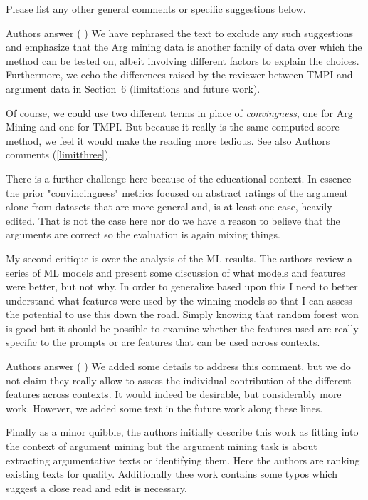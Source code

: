 \documentclass[notitlepage,12pt]{article}
\makeatletter
\newcounter{answ}
\newcommand{\customlabel}[2]{%
\protected@write \@auxout {}{\string \newlabel {#1}{{#2}{}}}}
\makeatother
\begin{document}
\begin{revcomment}{Please list any other general comments or specific suggestions below.}
\begin{authorstwo}{Authors answer (\textt{\theansw}\customlabel{limittwo}{\textt{\theansw}})}
  We have rephrased the text to exclude any such suggestions and emphasize that the Arg mining data is another family of data over which the method can be tested on, albeit involving different factors to explain the choices.  Furthermore, we echo the differences raised by the reviewer between TMPI and argument data in Section~6 (limitations and future work).

  Of course, we could use two different terms in place of \textit{convingness}, one for Arg Mining and one for TMPI.  But because it really is the same computed score method, we feel it would make the reading more tedious.  See also Authors comments (\ref{limitthree}).
  
\end{authorstwo}

    There is a further challenge here because of the educational context. In essence the prior "convincingness" metrics focused on abstract ratings of the argument alone from datasets that are more general and, is at least one case, heavily edited. That is not the case here nor do we have a reason to believe that the arguments are correct so the evaluation is again mixing things.

    My second critique is over the analysis of the ML results. The authors review a series of ML models and present some discussion of what models and features were better, but not why. In order to generalize based upon this I need to better understand what features were used by the winning models so that I can assess the potential to use this down the road. Simply knowing that random forest won is good but it should be possible to examine whether the features used are really specific to the prompts or are features that can be used across contexts.

    \begin{authorstwo}{Authors answer (\textt{\theansw}\customlabel{limitone}{\textt{\theansw}})}
      We added some details to address this comment, but we do not claim they really allow to assess the individual contribution of the different features across contexts.  It would indeed be desirable, but considerably more work.  However, we added some text in the future work along these lines.
    \end{authorstwo}

    Finally as a minor quibble, the authors initially describe this work as fitting into the context of argument mining but the argument mining task is about extracting argumentative texts or identifying them. Here the authors are ranking existing texts for quality. Additionally thee work contains some typos which suggest a close read and edit is necessary.


\end{revcomment}
\end{document}
